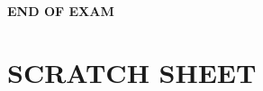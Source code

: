 \documentclass[addpoints,11pt]{exam}
\theoremstyle{definition}
\begin{document}
\hrulefill
\begin{center} 
	\textbf{END OF EXAM}
\end{center}

\newpage

\centering

\section*{SCRATCH SHEET}
\end{document}
